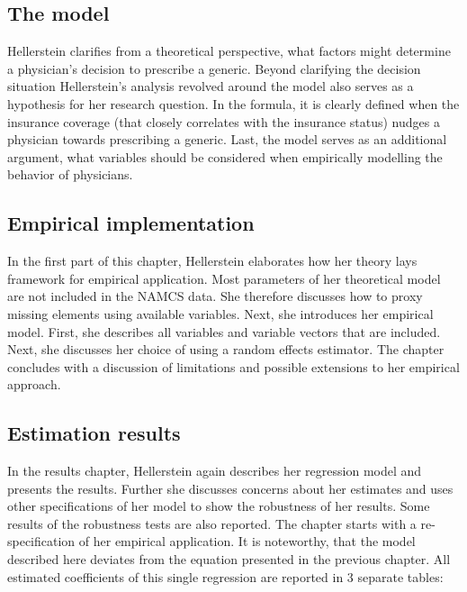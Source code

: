 \documentclass[
]{book}
\begin{document}
\hypertarget{the-model}{%
\subsection{The model}\label{the-model}}

Hellerstein clarifies from a theoretical perspective, what factors might
determine a physician's decision to prescribe a generic. Beyond
clarifying the decision situation Hellerstein's analysis revolved around
the model also serves as a hypothesis for her research question. In the
formula, it is clearly defined when the insurance coverage (that closely
correlates with the insurance status) nudges a physician towards
prescribing a generic. Last, the model serves as an additional argument,
what variables should be considered when empirically modelling the
behavior of physicians.

\hypertarget{empirical-implementation}{%
\subsection{Empirical implementation}\label{empirical-implementation}}

In the first part of this chapter, Hellerstein elaborates how her theory
lays framework for empirical application. Most parameters of her
theoretical model are not included in the NAMCS data. She therefore
discusses how to proxy missing elements using available variables. Next,
she introduces her empirical model. First, she describes all variables
and variable vectors that are included. Next, she discusses her choice
of using a random effects estimator. The chapter concludes with a
discussion of limitations and possible extensions to her empirical
approach.

\hypertarget{estimation-results}{%
\subsection{Estimation results}\label{estimation-results}}

In the results chapter, Hellerstein again describes her regression model
and presents the results. Further she discusses concerns about her
estimates and uses other specifications of her model to show the
robustness of her results. Some results of the robustness tests are also
reported. The chapter starts with a re-specification of her empirical
application. It is noteworthy, that the model described here deviates
from the equation presented in the previous chapter. All estimated
coefficients of this single regression are reported in 3 separate
tables:
\end{document}
